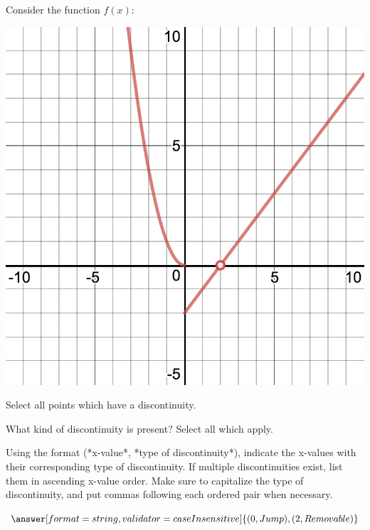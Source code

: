 \documentclass{ximera}
\begin{document}
\begin{question}
Consider the function $f(x)$:
\begin{image}
\includegraphics{continuity5}
\end{image}
Select all points which have a discontinuity.

\begin{selectAll}
\end{selectAll}

What kind of discontinuity is present? Select all which apply.

\begin{selectAll}
\end{selectAll}

Using the format (*x-value*, *type of discontinuity*), indicate the x-values with their corresponding type of discontinuity. If multiple discontinuities exist, list them in ascending x-value order. Make sure to capitalize the type of discontinuity, and put commas following each ordered pair when necessary.

$\answer[format=string,validator=caseInsensitive]{(0,Jump),(2,Removable)}$
\end{question}
\end{document}
